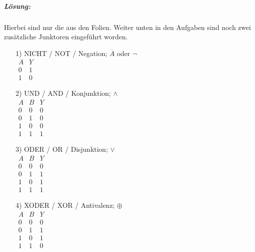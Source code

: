 \documentclass[12pt,a4paper,ngerman]{scrartcl}
\begin{document}
	\subparagraph{Lösung: }
	Hierbei sind nur die aus den Folien. Weiter unten in den Aufgaben sind noch zwei zusätzliche Junktoren eingeführt worden.
	\begin{itemize}
		\item[1)] NICHT / NOT / Negation; $\overline{A}$ oder $\neg$\\
		$\begin{array}{c|c}
			A & Y\\
			\hline
			0 & 1\\
			1 & 0 
		\end{array}$
		\item[2)] UND / AND / Konjunktion; $\wedge$\\
		$\begin{array}{cc|c}
			A & B & Y\\
			\hline
			0 & 0 & 0\\
			0 & 1 & 0\\
			1 & 0 & 0\\
			1 & 1 & 1
		\end{array}$
		\item[3)] ODER / OR / Disjunktion; $\vee$\\
		$\begin{array}{cc|c}
			A & B & Y\\
			\hline
			0 & 0 & 0\\
			0 & 1 & 1\\
			1 & 0 & 1\\
			1 & 1 & 1
		\end{array}$
		\item[4)] XODER / XOR / Antivalenz; $\oplus$\\
		$\begin{array}{cc|c}
			A & B & Y\\
			\hline
			0 & 0 & 0\\
			0 & 1 & 1\\
			1 & 0 & 1\\
			1 & 1 & 0
		\end{array}$
		
	\end{itemize}
	
\end{document}
